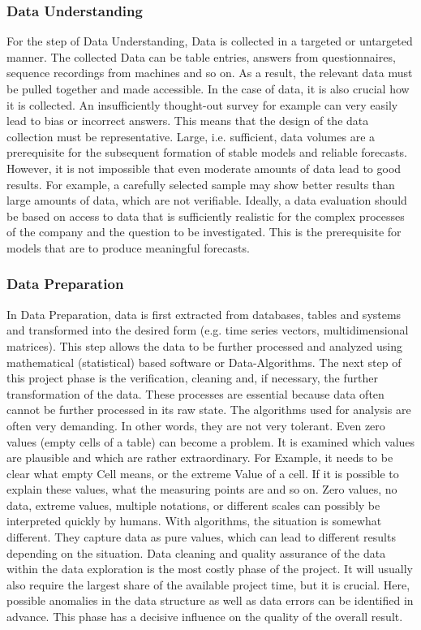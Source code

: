 \subsubsection{Data Understanding}
For the step of Data Understanding, Data is collected in a targeted or untargeted manner. 
The collected Data can be table entries, answers from questionnaires,
sequence recordings from machines and so on. 
As a result, the relevant data must be pulled together and made accessible.
In the case of data, it is also crucial how it is collected. 
An insufficiently thought-out survey for example can very easily lead to bias or incorrect answers. 
This means that the design of the data collection must be representative. 
Large, i.e. sufficient, data volumes are a prerequisite for the subsequent formation of
stable models and reliable forecasts. 
However, it is not impossible that even moderate amounts of data lead to good results. 
For example, a carefully selected sample may show better results than large amounts of data,
which are not verifiable. 
Ideally, a data evaluation should be based on access to data that is sufficiently realistic
for the complex processes of the company and the question to be investigated. 
This is the prerequisite for models that are to produce meaningful forecasts.

\subsubsection{Data Preparation}
In Data Preparation, data is first extracted from databases, tables and systems and transformed
into the desired form (e.g. time series vectors, multidimensional matrices). 
This step allows the data to be further processed and analyzed using mathematical (statistical)
based software or Data-Algorithms. 
The next step of this project phase is the verification, cleaning and, if necessary,
the further transformation of the data. 
These processes are essential because data often cannot be further processed in its raw state.
The algorithms used for analysis are often very demanding. 
In other words, they are not very tolerant. Even zero values (empty cells of a table)
can become a problem. 
It is examined which values are plausible and which are rather extraordinary. For Example,
it needs to be clear what empty Cell means, or the extreme Value of a cell. 
If it is possible to explain these values, what the measuring points are and so on.
Zero values, no data, extreme values, multiple notations, or different scales can possibly be
interpreted quickly by humans. 
With algorithms, the situation is somewhat different.
They capture data as pure values, which can lead to different results depending on the situation. 
Data cleaning and quality assurance of the data within the data exploration is the most costly phase
of the project. 
It will usually also require the largest share of the available project time, but it is crucial. 
Here, possible anomalies in the data structure as well as data errors can be identified in advance. 
This phase has a decisive influence on the quality of the overall result. 

